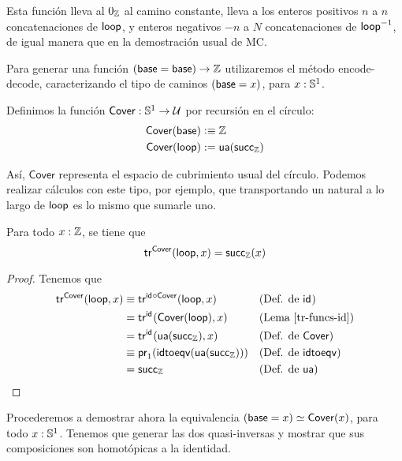 \documentclass[../main.tex]{subfiles}
\begin{document}
Esta funci\'on lleva al $0_\mathbb{Z}$ al camino constante, lleva a los enteros positivos $n$ a $n$ concatenaciones de $\mathsf{loop}$, y enteros negativos $-n$ a $N$ concatenaciones de $\mathsf{loop}^{-1}$, de igual manera que en la demostraci\'on usual de MC.

Para generar una funci\'on $(\mathsf{base} = \mathsf{base}) \to \mathbb{Z}$ utilizaremos el m\'etodo encode-decode, caracterizando el tipo de caminos $(\mathsf{base} = x)$, para $x:\mathbb{S}^1$.

\begin{definition}
  Definimos la funci\'on $\mathsf{Cover} : \mathbb{S}^1 \to \mathcal{U}$ por recursi\'on en el c\'irculo:
  \begin{align*}
    \mathsf{Cover}(\mathsf{base})  & \vcentcolon\equiv \mathbb{Z}       \\
    \mathsf{Cover}(\mathsf{loop}) & := \mathsf{ua}(\mathsf{succ}_\mathbb{Z})
  \end{align*}
\end{definition}

As\'i, $\mathsf{Cover}$ representa el espacio de cubrimiento usual del c\'irculo.
Podemos realizar c\'alculos con este tipo, por ejemplo, que transportando un natural a lo largo de $\mathsf{loop}$ es lo mismo que sumarle uno.

\begin{lemma}\label{tr-Cover-loop}
  Para todo $x:\mathbb{Z}$, se tiene que
  \[ \mathsf{tr}^{\mathsf{Cover}}(\mathsf{loop},x) = \mathsf{succ}_\mathbb{Z}(x) \]
\end{lemma}
\begin{proof}
  Tenemos que
  \begin{align*}
    \mathsf{tr}^{\mathsf{Cover}}(\mathsf{loop},x)
     & \equiv \mathsf{tr}^{\mathsf{id}_{}\circ \mathsf{Cover}}(\mathsf{loop},x) &  & \text{(Def. de \ensuremath{\mathsf{id}_{}})}          \\
     & = \mathsf{tr}^{\mathsf{id}_{}}(\mathsf{Cover}(\mathsf{loop}),x)         &  & \text{(Lema \ref{tr-funcs-id})}   \\
     & = \mathsf{tr}^{\mathsf{id}_{}}(\mathsf{ua}(\mathsf{succ}_\mathbb{Z}),x)                   &  & \text{(Def. de $\mathsf{Cover}$)} \\
     & \equiv \mathsf{pr}_{1} (\mathsf{idtoeqv} (\mathsf{ua}(\mathsf{succ}_\mathbb{Z})))                 &  & \text{(Def. de \ensuremath{\mathsf{idtoeqv}})}         \\
     & = \mathsf{succ}_\mathbb{Z}                                            &  & \text{(Def. de \ensuremath{\mathsf{ua}})}
  \end{align*}
\end{proof}

Procederemos a demostrar ahora la equivalencia $(\mathsf{base} = x) \simeq \mathsf{Cover}(x)$, para todo $x:\mathbb{S}^1$. Tenemos que generar las dos quasi-inversas y mostrar que sus composiciones son homot\'opicas a la identidad.
\end{document}
